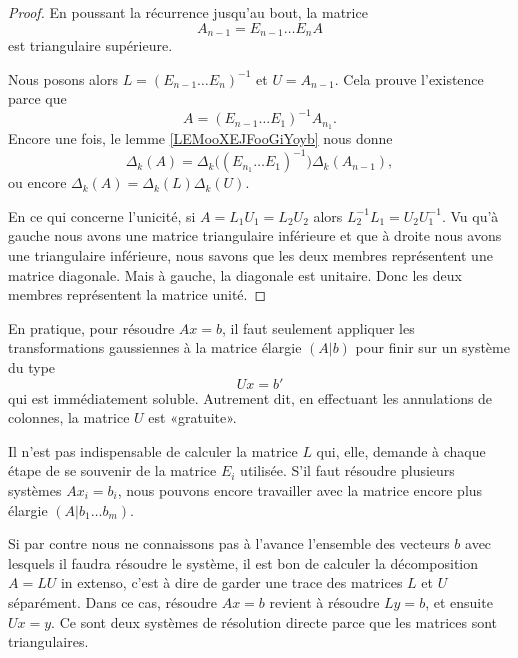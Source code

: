 \begin{proof}
    En poussant la récurrence jusqu'au bout, la matrice
    \begin{equation}
        A_{n-1}=E_{n-1}\ldots E_nA
    \end{equation}
    est triangulaire supérieure. 

    Nous posons alors \(   L=(E_{n-1}\ldots E_n)^{-1}  \) et \( U=A_{n-1}\). Cela prouve l'existence parce que
    \begin{equation}
        A=(E_{n-1}\ldots E_1)^{-1}A_{n_1}.
    \end{equation}
    Encore une fois, le lemme \ref{LEMooXEJFooGiYoyb} nous donne
    \begin{equation}
        \Delta_k(A)=\Delta_k\Big( (E_{n_1}\ldots E_1)^{-1} \Big)\Delta_k(A_{n-1}),
    \end{equation}
    ou encore \( \Delta_k(A)=\Delta_k(L)\Delta_k(U)\).
    
    En ce qui concerne l'unicité, si \( A=L_1U_1=L_2U_2\) alors \( L_2^{-1}L_1=U_2U_1^{-1} \). Vu qu'à gauche nous avons une matrice triangulaire inférieure et que à droite nous avons une triangulaire inférieure, nous savons que les deux membres représentent une matrice diagonale. Mais à gauche, la diagonale est unitaire. Donc les deux membres représentent la matrice unité.
\end{proof}

\begin{normaltext}
    En pratique, pour résoudre \( Ax=b\), il faut seulement appliquer les transformations gaussiennes à la matrice élargie \( (A|b)\) pour finir sur un système du type
    \begin{equation}
        Ux=b'
    \end{equation}
    qui est immédiatement soluble. Autrement dit, en effectuant les annulations de colonnes, la matrice \( U\) est «gratuite».
    
    Il n'est pas indispensable de calculer la matrice \( L\) qui, elle, demande à chaque étape de se souvenir de la matrice \( E_i\) utilisée. S'il faut résoudre plusieurs systèmes \( Ax_i=b_i\), nous pouvons encore travailler avec la matrice encore plus élargie \( (A|b_1\ldots b_m)\).

    Si par contre nous ne connaissons pas à l'avance l'ensemble des vecteurs \( b\) avec lesquels il faudra résoudre le système, il est bon de calculer la décomposition \( A=LU \) in extenso, c'est à dire de garder une trace des matrices \( L\) et \( U\) séparément. Dans ce cas, résoudre \( Ax=b\) revient à résoudre \( Ly=b\), et ensuite \( Ux=y\). Ce sont deux systèmes de résolution directe parce que les matrices sont triangulaires.
\end{normaltext}

